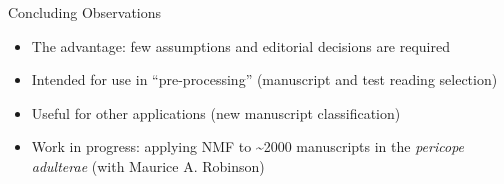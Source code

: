 \documentclass[10pt]{beamer}
\begin{document}
	\begin{frame}{Concluding Observations}
		\begin{itemize}
			\item The advantage: few assumptions and editorial decisions are required
			\item Intended for use in ``pre-processing'' (manuscript and test reading selection)
			\item Useful for other applications (new manuscript classification)
			\item Work in progress: applying NMF to \textasciitilde 2000 manuscripts in the \emph{pericope adulterae} (with Maurice A. Robinson)
		\end{itemize}
	\end{frame}
	\begin{frame}[allowframebreaks]
		\printbibliography
	\end{frame}
\end{document}
